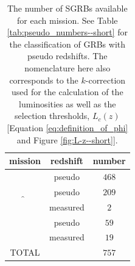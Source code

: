 \begin{table}
\caption[Categories of short GRBs used for modelling LF]{The number of SGRBs available for each mission. See Table \ref{tab:pseudo_numbers--short} for the classification of GRBs with pseudo redshifts. The nomenclature here also corresponds to the $k$-correction used for the calculation of the luminosities as well as the selection thresholds, $L_{c} (z)$ [Equation \ref{eq:definition_of_phi} and Figure \ref{fig:L-z--short}].
\label{tab:GRBs_used_for_modelling_LF--short}}
\begin{center}
\begin{tabular}{|c|c|c|}
\hline
mission & redshift & number \\
\hline
\hline
\B &  pseudo & $468$ \\
\hline
\multirow{2}{*}{\f} & pseudo & $209$ \\
\cline{2-3} 
 & measured & $2$ \\
\hline
\multirow{2}{*}{\s} & pseudo & $59$ \\
\cline{2-3}
 & measured & $19$ \\
\hline
\hline
TOTAL & & $757$ \\
\hline
\end{tabular}
\end{center}
\end{table}


